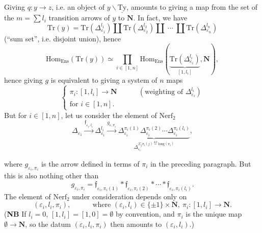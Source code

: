 \documentclass[11pt]{article}
\newcommand{\printedpage}[1]{\marginpar{\footnotesize p.~#1}}
\newcommand{\msp}[1]{\marginpar{\footnotesize [#1]}}
\newcommand{\uTy}{\underline{\mathrm{Ty}}}
\begin{document}
\printedpage{36}
Giving $q : y\longrightarrow z$, i.e. an object of $y\backslash\uTy$, amounts to giving a map from the set of the $m=\sum l_i$ transition arrows of $y$ to $\mathbf{N}$. In fact, we have %
\[
\mathrm{Tr}(y) = \mathrm{Tr}(\Delta^{l_1}_{\varepsilon_1})\amalg\mathrm{Tr}(\Delta^{l_2}_{\varepsilon_2})\amalg\ \cdots\ \amalg\mathrm{Tr}(\Delta^{l_n}_{\varepsilon_n})
\]
(``sum set'', i.e. disjoint union), hence
\[
\mathrm{Hom}_{\mathrm{Ens}}(\mathrm{Tr}(y)) \simeq \prod_{i\in[1,n]}\mathrm{Hom}_{\mathrm{Ens}}(\underbrace{\mathrm{Tr}(\Delta^{l_i}_{\varepsilon_i})}_{[1,l_i]},\mathbf{N}), %
\]
hence giving $g$ is equivalent to giving a system of $n$ maps
\[
\left\{
\begin{array}{l}
\pi_i : [1,l_i]\longrightarrow\mathbf{N} \qquad\quad (\text{weighting of }\Delta^{l_i}_{\varepsilon_i})\\[6pt]
\text{for } i\in[1,n].
\end{array}
\right.
\]
But for $i\in[1,n]$, let us consider the element of $\mathrm{Nerf}_2$
\[
\Delta_{\varepsilon_1}\xrightarrow{\mathfrak{f}_{\varepsilon_i,l_i}}\Delta^{l_i}_{\varepsilon_i}\xrightarrow{g_{\varepsilon,\pi_i}}\underbrace{\Delta^{\pi_i(1)}_{\varepsilon_i}\Delta^{\pi_i(2)}_{\varepsilon_i}\cdots\Delta^{\pi_i(l_i)}_{\varepsilon_i}}_{\Delta_{\varepsilon_i}^{\Sigma_j\pi_i(j)\overset{\text{def}}{=}\mathrm{long}(\pi_i)}}, %
\tag*{(1)}
\]

\msp{page 53}
where $g_{\varepsilon_i,\pi_i}$ is the arrow defined in terms of $\pi_i$ in the preceding paragraph. But this is also nothing other than
\[
g_{\varepsilon_i,\pi_i} = \mathfrak{f}_{\varepsilon_i,\pi_i(1)}*\mathfrak{f}_{\varepsilon_i,\pi_i(2)}*\cdots*\mathfrak{f}_{\varepsilon_i,\pi_i(l_i)}.
\tag*{(2)}
\]
The element of $\mathrm{Nerf}_2$ under consideration depends only on
\[
(\varepsilon_i,l_i,\pi_i), \qquad\quad \text{where } (\varepsilon_i,l_i)\in\{\pm1\}\times\mathbf{N},\ \pi_i : [1,l_i]\longrightarrow\mathbf{N}.
\]
(\textbf{NB} If $l_i=0$, $[1,l_i]=[1,0]=\emptyset$ by convention, and $\pi_i$ is the unique map $\emptyset\longrightarrow\mathbf{N}$, so the datum $(\varepsilon_i,l_i,\pi_i)$ then amounts to $(\varepsilon_i,l_i)$.)
\end{document}
